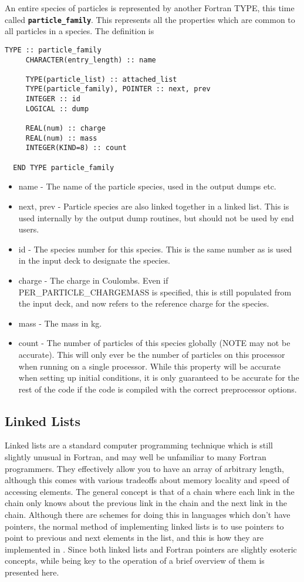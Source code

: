 \documentclass[12pt,a4paper]{article}
\newcommand{\simpleboxverbatim}{\begin{Verbatim}[obeytabs=true,frame=single,
  framerule=0.5mm,rulecolor=\color{warwickmid},formatcom=\color{black}]}
\newcommand{\inlinecode}[1]{{\color{warwickred} \bf\texttt{#1}}}
\newcommand{\EPOCH}{{\color{warwickdark}\fontfamily{phv}\selectfont{EPOCH}}}
\begin{document}
An entire species of particles is represented by another Fortran TYPE, this
time called \inlinecode{particle\_family}. This represents all the properties
which are common to all particles in a species. The definition is

\simpleboxverbatim
  TYPE :: particle_family
     CHARACTER(entry_length) :: name

     TYPE(particle_list) :: attached_list
     TYPE(particle_family), POINTER :: next, prev
     INTEGER :: id
     LOGICAL :: dump

     REAL(num) :: charge
     REAL(num) :: mass
     INTEGER(KIND=8) :: count

  END TYPE particle_family
\end{Verbatim}

\begin{itemize}
\item name - The name of the particle species, used in the output dumps etc.
\item next, prev - Particle species are also linked together in a linked
  list. This is used internally by the output dump routines, but should not be
  used by end users.
\item id - The species number for this species. This is the same number as is
  used in the input deck to designate the species.
\item charge - The charge in Coulombs. Even if PER\_PARTICLE\_CHARGEMASS is
  specified, this is still populated from the input deck, and now refers to
  the reference charge for the species.
\item mass - The mass in kg.
\item count - The number of particles of this species globally (NOTE may not
  be accurate). This will only ever be the number of particles on this
  processor when running on a single processor. While this property will be
  accurate when setting up initial conditions, it is only guaranteed to be
  accurate for the rest of the code if the code is compiled with the correct
  preprocessor options.
\end{itemize}

\subsection{Linked Lists}
Linked lists are a standard computer programming technique which is still
slightly unusual in Fortran, and may well be unfamiliar to many Fortran
programmers. They effectively allow you to have an array of arbitrary length,
although this comes with various tradeoffs about memory locality and speed of
accessing elements. The general concept is that of a chain where each link in
the chain only knows about the previous link in the chain and the next link in
the chain. Although there are schemes for doing this in languages which don't
have pointers, the normal method of implementing linked lists is to use
pointers to point to previous and next elements in the list, and this is how
they are implemented in \EPOCH. Since both linked lists and Fortran pointers
are slightly esoteric concepts, while being key to the operation of {\EPOCH} a
brief overview of them is presented here.\\
\end{document}
